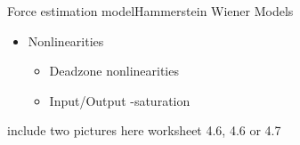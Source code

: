 \begin{frame}{Force estimation model}{Hammerstein Wiener Models}
\begin{itemize}
  \item Nonlinearities
  \begin{itemize}
    \item Deadzone nonlinearities
    \item Input/Output -saturation 
  \end{itemize}
\end{itemize}




include two pictures here worksheet 4.6, 4.6 or 4.7



\begin{columns}[T]
\centering
\begin{column}{.49\textwidth}


\end{column}%
\hfill%
\begin{column}{.49\textwidth}


\end{column}
\end{columns}



\end{frame}












